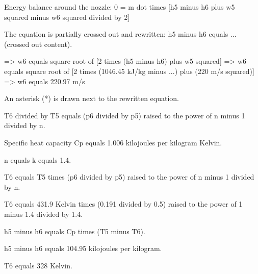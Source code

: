 Energy balance around the nozzle:  
0 = m dot times [h5 minus h6 plus w5 squared minus w6 squared divided by 2]  

The equation is partially crossed out and rewritten:  
h5 minus h6 equals ... (crossed out content).  

=> w6 equals square root of [2 times (h5 minus h6) plus w5 squared]  
=> w6 equals square root of [2 times (1046.45 kJ/kg minus ...) plus (220 m/s squared)]  
=> w6 equals 220.97 m/s  

An asterisk (*) is drawn next to the rewritten equation.

T6 divided by T5 equals (p6 divided by p5) raised to the power of n minus 1 divided by n.  

Specific heat capacity Cp equals 1.006 kilojoules per kilogram Kelvin.  

n equals k equals 1.4.  

T6 equals T5 times (p6 divided by p5) raised to the power of n minus 1 divided by n.  

T6 equals 431.9 Kelvin times (0.191 divided by 0.5) raised to the power of 1 minus 1.4 divided by 1.4.  

h5 minus h6 equals Cp times (T5 minus T6).  

h5 minus h6 equals 104.95 kilojoules per kilogram.  

T6 equals 328 Kelvin.